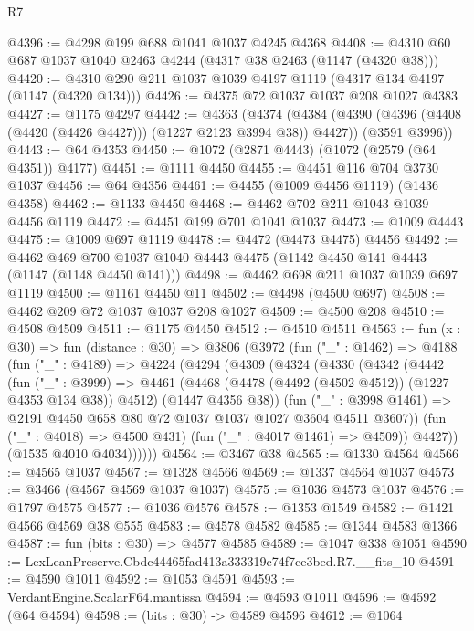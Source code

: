 \begin{lexlean}{R7}
\begin{coremodule}
@4396 := @4298 @199 @688 @1041 @1037 @4245 @4368
@4408 := @4310 @60 @687 @1037 @1040 @2463 @4244 (@4317 @38 @2463 (@1147 (@4320 @38)))
@4420 := @4310 @290 @211 @1037 @1039 @4197 @1119 (@4317 @134 @4197 (@1147 (@4320 @134)))
@4426 := @4375 @72 @1037 @1037 @208 @1027 @4383
@4427 := @1175 @4297
@4442 := @4363
    (@4374
      (@4384 (@4390 (@4396 (@4408 (@4420 (@4426 @4427))) (@1227 @2123 @3994 @38)) @4427))
      (@3591 @3996))
@4443 := @64 @4353
@4450 := @1072 (@2871 @4443) (@1072 (@2579 (@64 @4351)) @4177)
@4451 := @1111 @4450
@4455 := @4451 @116 @704 @3730 @1037
@4456 := @64 @4356
@4461 := @4455 (@1009 @4456 @1119) (@1436 @4358)
@4462 := @1133 @4450
@4468 := @4462 @702 @211 @1043 @1039 @4456 @1119
@4472 := @4451 @199 @701 @1041 @1037
@4473 := @1009 @4443
@4475 := @1009 @697 @1119
@4478 := @4472 (@4473 @4475) @4456
@4492 := @4462 @469 @700 @1037 @1040 @4443 @4475 (@1142 @4450 @141 @4443 (@1147 (@1148 @4450 @141)))
@4498 := @4462 @698 @211 @1037 @1039 @697 @1119
@4500 := @1161 @4450 @11
@4502 := @4498 (@4500 @697)
@4508 := @4462 @209 @72 @1037 @1037 @208 @1027
@4509 := @4500 @208
@4510 := @4508 @4509
@4511 := @1175 @4450
@4512 := @4510 @4511
@4563 := fun (x : @30) =>
  fun (distance : @30) =>
  @3806
    (@3972
      (fun ("_" : @1462) =>
      @4188
        (fun ("_" : @4189) =>
        @4224
          (@4294
            (@4309
              (@4324
                (@4330
                  (@4342
                    (@4442
                      (fun ("_" : @3999) =>
                      @4461
                        (@4468 (@4478 (@4492 (@4502 @4512)) (@1227 @4353 @134 @38)) @4512)
                        (@1447 @4356 @38))
                      (fun ("_" : @3998 @1461) =>
                      @2191 @4450 @658 @80 @72 @1037 @1037 @1027 @3604 @4511 @3607))
                    (fun ("_" : @4018) => @4500 @431)
                    (fun ("_" : @4017 @1461) => @4509))
                  @4427))
              (@1535 @4010 @4034))))))
@4564 := @3467 @38
@4565 := @1330 @4564
@4566 := @4565 @1037
@4567 := @1328 @4566
@4569 := @1337 @4564 @1037
@4573 := @3466 (@4567 @4569 @1037 @1037)
@4575 := @1036 @4573 @1037
@4576 := @1797 @4575
@4577 := @1036 @4576
@4578 := @1353 @1549
@4582 := @1421 @4566 @4569 @38 @555
@4583 := @4578 @4582
@4585 := @1344 @4583 @1366
@4587 := fun (bits : @30) => @4577 @4585
@4589 := @1047 @338 @1051
@4590 := LexLeanPreserve.Cbdc44465fad413a333319c74f7ce3bed.R7.__fits_10
@4591 := @4590 @1011
@4592 := @1053 @4591
@4593 := VerdantEngine.ScalarF64.mantissa
@4594 := @4593 @1011
@4596 := @4592 (@64 @4594)
@4598 := (bits : @30) -> @4589 @4596
@4612 := @1064

\end{coremodule}
\end{lexlean}
